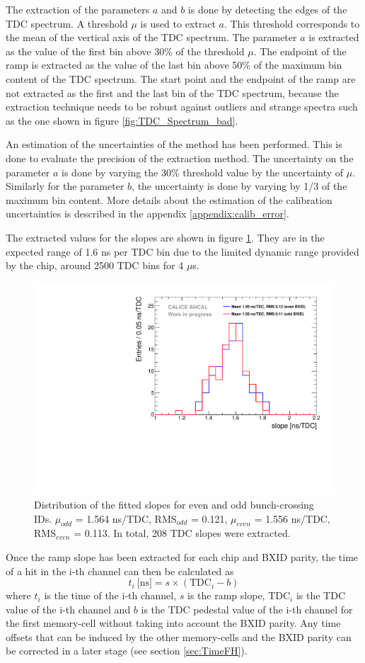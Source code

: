 The extraction of the parameters $a$ and $b$ is done by detecting the edges of the TDC spectrum. A threshold $\mu$ is used to extract $a$. This threshold corresponds to the mean of the vertical axis of the TDC spectrum. The parameter $a$ is extracted as the value of the first bin above 30\% of the threshold $\mu$. The endpoint of the ramp is extracted as the value of the last bin above 50\% of the maximum bin content of the TDC spectrum. The start point and the endpoint of the ramp are not extracted as the first and the last bin of the TDC spectrum, because the extraction technique needs to be robust against outliers and strange spectra such as the one shown in figure \ref{fig:TDC_Spectrum_bad}.

An estimation of the uncertainties of the method has been performed. This is done to evaluate the precision of the extraction method. The uncertainty on the parameter $a$ is done by varying the 30\% threshold value by the uncertainty of $\mu$. Similarly for the parameter $b$, the uncertainty is done by varying by 1/3 of the maximum bin content. More details about the estimation of the calibration uncertainties is described in the appendix \ref{appendix:calib_error}.

The extracted values for the slopes are shown in figure \ref{fig:slope_time}. They are in the expected range of 1.6 ns per TDC bin due to the limited dynamic range provided by the chip, around 2500 TDC bins for 4 $\mu$s.

\begin{figure}[htbp!]
	\centering
	\includegraphics[width=0.5\linewidth]{../Thesis_Plots/Timing/Muons/Plots/SlopesTDC.pdf}
	\caption{Distribution of the fitted slopes for even and odd bunch-crossing IDs. $\mu_{odd}$ = 1.564 ns/TDC, RMS$_{odd}$ = 0.121, $\mu_{even}$ = 1.556 ns/TDC, RMS$_{even}$ = 0.113. In total, 208 TDC slopes were extracted.} \label{fig:slope_time}
\end{figure}

Once the ramp slope has been extracted for each chip and BXID parity, the time of a hit in the i-th channel can then be calculated as
\begin{equation} \label{eq:time_chn}
	t_{i} \: \text{[ns]} = s \times (\text{TDC}_{i} - b)
\end{equation}
where $t_{i}$ is the time of the i-th channel, $s$ is the ramp slope, TDC$_{i}$ is the TDC value of the i-th channel and $b$ is the TDC pedestal value of the i-th channel for the first memory-cell without taking into account the BXID parity. Any time offsets that can be induced by the other memory-cells and the BXID parity can be corrected in a later stage (see section \ref{sec:TimeFH}).

